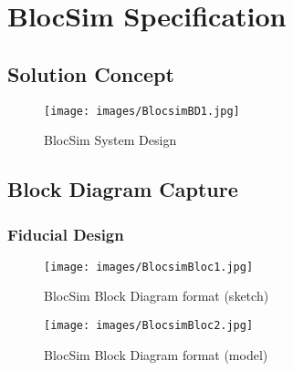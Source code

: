 






\chapter{BlocSim Specification}
\label{ch:spec}


\section{Solution Concept}


\begin{figure}[ht!]
\centering
\texttt{[image: images/BlocsimBD1.jpg]}
\caption{BlocSim System Design \cite{blocsimPoster}}
\label{im:BlocsimBD1}
\end{figure}

\clearpage





\section{Block Diagram Capture}



\subsection{Fiducial Design}




\begin{figure}[ht!]
\centering
\texttt{[image: images/BlocsimBloc1.jpg]}
\caption{BlocSim Block Diagram format (sketch)}
\label{im:BlocsimBD1}
\end{figure}

\begin{figure}[ht!]
\centering
\texttt{[image: images/BlocsimBloc2.jpg]}
\caption{BlocSim Block Diagram format (model)}
\label{im:BlocsimBD2}
\end{figure}

